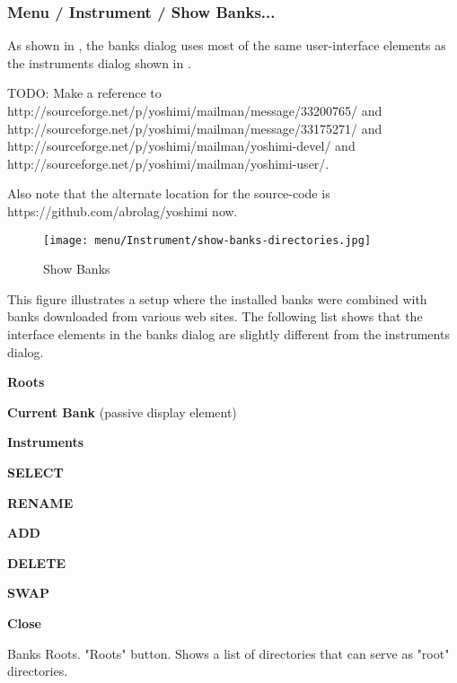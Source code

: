 \subsubsection{Menu / Instrument / Show Banks...}
\label{subsubsec:menu_instrument_show_banks}

   As shown in
   ,
   the banks dialog uses most of the same
   user-interface elements as the instruments dialog shown in
   .

   TODO:  Make a reference to
   http://sourceforge.net/p/yoshimi/mailman/message/33200765/
   and
   http://sourceforge.net/p/yoshimi/mailman/message/33175271/
   and
   http://sourceforge.net/p/yoshimi/mailman/yoshimi-devel/
   and
   http://sourceforge.net/p/yoshimi/mailman/yoshimi-user/.

   Also note that the alternate location for the source-code is
   https://github.com/abrolag/yoshimi now.


\begin{figure}[H]
   \centering 
   \texttt{[image: menu/Instrument/show-banks-directories.jpg]}
   \caption[Show Banks]{Show Banks}
   \label{fig:show_banks_directories}
\end{figure}

   This figure illustrates a setup where the installed banks were combined with
   banks downloaded from various web sites.
   The following list shows that the interface elements in the banks dialog
   are slightly different from the instruments dialog.

   \begin{enumber}
      \item \textbf{Roots}
      \item \textbf{Current Bank} (passive display element)
      \item \textbf{Instruments}
      \item \textbf{SELECT}
      \item \textbf{RENAME}
      \item \textbf{ADD}
      \item \textbf{DELETE}
      \item \textbf{SWAP}
      \item \textbf{Close}
   \end{enumber}

   Banks Roots.
   "Roots" button.
   Shows a list of directories that can serve as "root" directories.

